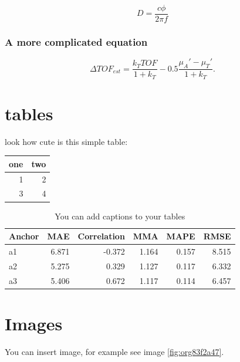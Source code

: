 \begin{equation}
\label{eq:org2c611fb}
D = \frac{c\phi}{2\pi f}
\end{equation}

\subsubsection{A more complicated equation}
\label{sec:orga13015b}

\begin{equation}
\Delta TOF_{est} = \frac{k_T TOF}{1+k_T } - 0.5 \frac{\mu_A' - \mu_T'}{1+k_T}.
\end{equation}

\section{tables}
\label{sec:orgbae75d1}

look how cute is this simple table:

\begin{center}
\begin{tabular}{rr}
one & two\\
\hline
1 & 2\\
3 & 4\\
\end{tabular}
\end{center}

\begin{table}[htbp]
\caption{\label{tab:orgf5f8bf9}
You can add captions to your tables}
\centering
\begin{tabular}{lrrrrr}
Anchor & MAE & Correlation & MMA & MAPE & RMSE\\
\hline
a1 & 6.871 & -0.372 & 1.164 & 0.157 & 8.515\\
a2 & 5.275 & 0.329 & 1.127 & 0.117 & 6.332\\
a3 & 5.406 & 0.672 & 1.117 & 0.114 & 6.457\\
\end{tabular}
\end{table}

\section{Images}
\label{sec:org053fbc0}
You can insert image, for example see image \ref{fig:org83f2a47}.

